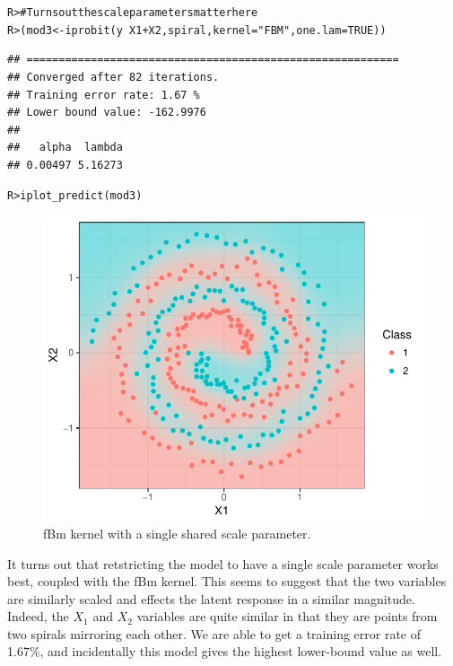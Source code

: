 \documentclass[a4paper,showframe,11pt]{report}\usepackage[]{graphicx}\usepackage[]{color}
\makeatletter
\newcommand{\hlnum}[1]{\textcolor[rgb]{0.063,0.58,0.627}{#1}}%
\newcommand{\hlstr}[1]{\textcolor[rgb]{0.063,0.58,0.627}{#1}}%
\newcommand{\hlcom}[1]{\textcolor[rgb]{0.588,0.588,0.588}{#1}}%
\newcommand{\hlopt}[1]{\textcolor[rgb]{0.196,0.196,0.196}{#1}}%
\newcommand{\hlstd}[1]{\textcolor[rgb]{0.196,0.196,0.196}{#1}}%
\newcommand{\hlkwb}[1]{\textcolor[rgb]{0.627,0,0.314}{#1}}%
\newcommand{\hlkwc}[1]{\textcolor[rgb]{0,0.631,0.314}{#1}}%
\newcommand{\hlkwd}[1]{\textcolor[rgb]{0.78,0.227,0.412}{#1}}%
\newenvironment{kframe}{%
 \def\at@end@of@kframe{}%
 \ifinner\ifhmode%
  \def\at@end@of@kframe{\end{minipage}}%
  \begin{minipage}{\columnwidth}%
 \fi\fi%
 \def\FrameCommand##1{\hskip\@totalleftmargin \hskip-\fboxsep
 \colorbox{shadecolor}{##1}\hskip-\fboxsep
     \hskip-\linewidth \hskip-\@totalleftmargin \hskip\columnwidth}%
 \MakeFramed {\advance\hsize-\width
   \@totalleftmargin\z@ \linewidth\hsize
   \@setminipage}}%
 {\par\unskip\endMakeFramed%
 \at@end@of@kframe}
\newenvironment{knitrout}{}{} %
\makeatother
\begin{document}
\begin{knitrout}
\color{fgcolor}\begin{kframe}
\begin{alltt}
\hlstd{R> }\hlcom{# Turns out the scale parameters matter here}
\hlstd{R> }\hlstd{(mod3} \hlkwb{<-} \hlkwd{iprobit}\hlstd{(y} \hlopt{~} \hlstd{X1} \hlopt{+} \hlstd{X2, spiral,} \hlkwc{kernel} \hlstd{=} \hlstr{"FBM"}\hlstd{,} \hlkwc{one.lam} \hlstd{=} \hlnum{TRUE}\hlstd{))}
\end{alltt}
\begin{verbatim}
## ==========================================================
## Converged after 82 iterations.
## Training error rate: 1.67 %
## Lower bound value: -162.9976 
## 
##   alpha  lambda 
## 0.00497 5.16273
\end{verbatim}
\begin{alltt}
\hlstd{R> }\hlkwd{iplot_predict}\hlstd{(mod3)}
\end{alltt}
\end{kframe}\begin{figure}[h]

{\centering \includegraphics[width=0.7\linewidth]{figure/spiral_fbm_onelam-1} 

}

\caption[fBm kernel with a single shared scale parameter]{fBm kernel with a single shared scale parameter.}\label{fig:spiral_fbm_onelam}
\end{figure}


\end{knitrout}

It turns out that retstricting the model to have a single scale parameter works best, coupled with the fBm kernel. This seems to suggest that the two variables are similarly scaled and effects the latent response in a similar magnitude. Indeed, the $X_1$ and $X_2$ variables are quite similar in that they are points from two spirals mirroring each other. We are able to get a training error rate of 1.67\%, and incidentally this model gives the highest lower-bound value as well.
\end{document}
